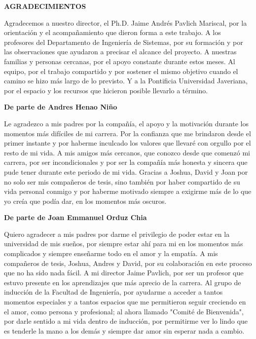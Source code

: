 \begin{center}
    \textbf{AGRADECIMIENTOS}
\end{center}

\vspace{0.25cm}

Agradecemos a nuestro director, el Ph.D. Jaime Andrés Pavlich Mariscal, por la orientación y el acompañamiento que dieron forma a este trabajo. A los profesores del Departamento de Ingeniería de Sistemas, por su formación y por las observaciones que ayudaron a precisar el alcance del proyecto. A nuestras familias y personas cercanas, por el apoyo constante durante estos meses. Al equipo, por el trabajo compartido y por sostener el mismo objetivo cuando el camino se hizo más largo de lo previsto. Y a la Pontificia Universidad Javeriana, por el espacio y los recursos que hicieron posible llevarlo a término.

\vspace{0.5cm}

\noindent\textbf{De parte de Andres Henao Niño}

Le agradezco a mis padres por la compañía, el apoyo y la motivación durante los momentos más difíciles de mi carrera. Por la confianza que me brindaron desde el primer instante y por haberme inculcado los valores que llevaré con orgullo por el resto de mi vida. A mis amigos más cercanos, que conozco desde que comenzó mi carrera, por ser incondicionales y por ser la compañía más honesta y sincera que pude tener durante este periodo de mi vida. Gracias a Joshua, David y Joan por no solo ser mis compañeros de tesis, sino también por haber compartido de su vida personal conmigo y por haberme motivado siempre a exigirme más de lo que yo creía que podía dar, en los momentos más oscuros.

\vspace{0.5cm}

\noindent\textbf{De parte de Joan Emmanuel Orduz Chia}

Quiero agradecer a mis padres por darme el privilegio de poder estar en la universidad de mis sueños, por siempre estar ahí para mi en los momentos más complicados y siempre enseñarme todo en el amor y la empatía. A mis compañeros de tesis, Joshua, Andres y David, por su colaboración en este proceso que no ha sido nada fácil. A mi director Jaime Pavlich, por ser un profesor que estuvo presente en los aprendizajes que más aprecio de la carrera. Al grupo de inducción de la Facultad de Ingeniería, por ayudarme a acceder a tantos momentos especiales y a tantos espacios que me permitieron seguir creciendo en el amor, como persona y profesional; al ahora llamado "Comité de Bienvenida", por darle sentido a mi vida dentro de inducción, por permitirme ver lo lindo que es tenderle la mano a los demás y siempre dar amor sin esperar nada a cambio.

